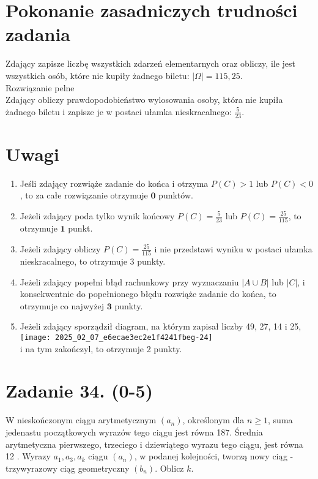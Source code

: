 \documentclass[10pt]{article}
\begin{document}
\section*{Pokonanie zasadniczych trudności zadania}
Zdający zapisze liczbę wszystkich zdarzeń elementarnych oraz obliczy, ile jest wszystkich osób, które nie kupiły żadnego biletu: $|\Omega|=115,25$.\\
Rozwiązanie pelne\\
Zdający obliczy prawdopodobieństwo wylosowania osoby, która nie kupiła żadnego biletu i zapisze je w postaci ułamka nieskracalnego: $\frac{5}{23}$.

\section*{Uwagi}
\begin{enumerate}
  \item Jeśli zdający rozwiąże zadanie do końca i otrzyma $P(C)>1$ lub $P(C)<0$, to za całe rozwiązanie otrzymuje $\mathbf{0}$ punktów.
  \item Jeżeli zdający poda tylko wynik końcowy $P(C)=\frac{5}{23}$ lub $P(C)=\frac{25}{115}$, to otrzymuje $\mathbf{1}$ punkt.
  \item Jeżeli zdający obliczy $P(C)=\frac{25}{115}$ i nie przedstawi wyniku w postaci ułamka nieskracalnego, to otrzymuje 3 punkty.
  \item Jeżeli zdający popełni błąd rachunkowy przy wyznaczaniu $|A \cup B|$ lub $|C|$, i konsekwentnie do popełnionego błędu rozwiąże zadanie do końca, to otrzymuje co najwyżej $\mathbf{3}$ punkty.
  \item Jeżeli zdający sporządził diagram, na którym zapisał liczby 49, 27, 14 i 25,\\
\texttt{[image: 2025\_02\_07\_e6ecae3ec2e1f4241fbeg-24]}\\
i na tym zakończyl, to otrzymuje 2 punkty.
\end{enumerate}

\section*{Zadanie 34. (0-5)}
W nieskończonym ciągu arytmetycznym $\left(a_{n}\right)$, określonym dla $n \geq 1$, suma jedenastu początkowych wyrazów tego ciągu jest równa 187. Średnia arytmetyczna pierwszego, trzeciego i dziewiątego wyrazu tego ciągu, jest równa 12 . Wyrazy $a_{1}, a_{3}, a_{k}$ ciągu $\left(a_{n}\right)$, w podanej kolejności, tworzą nowy ciąg - trzywyrazowy ciąg geometryczny $\left(b_{n}\right)$. Oblicz $k$.
\end{document}
